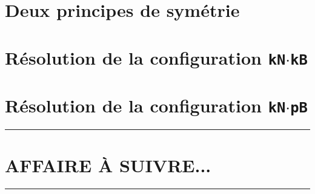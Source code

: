 \documentclass[12pt]{amsart}
\begin{document}


\section{Deux principes de symétrie}






\section{Résolution de la configuration \texttt{kN$\cdot$kB}}







\section{Résolution de la configuration \texttt{kN$\cdot$pB}}









\bigskip

\hrule

\section{AFFAIRE À SUIVRE...}

\bigskip

\hrule



%
%
%
%

%
%
%
%
%
%
%
%
%
%
\end{document}
